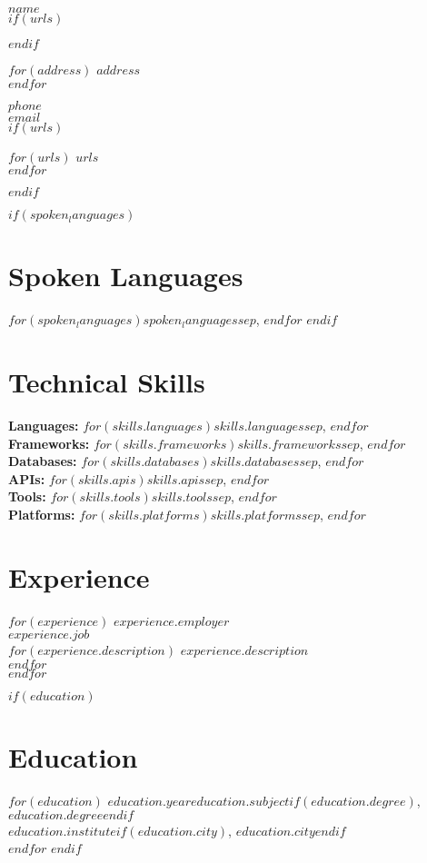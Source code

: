 \documentclass[$fontsize$, a4paper]{article}
\newcommand{\note}[1]{\marginnote{\scriptsize #1}}
\begin{document}
{\LARGE $name$}\\[.2cm]

$if(urls)$
\begin{multicols}{2}
$endif$

$for(address)$
$address$\\
$endfor$

\vspace{-10pt}

$phone$\\
\href{mailto:$email$}{$email$}\\


$if(urls)$
\columnbreak

$for(urls)$
\href{http://$urls$}{$urls$}\\
$endfor$
\end{multicols}
$endif$

\vspace{30pt}

$if(spoken_languages)$
\section*{Spoken Languages}
\noindent
$for(spoken_languages)$$spoken_languages$$sep$, $endfor$
\vspace{20pt}
$endif$

\section*{Technical Skills}
\noindent
\textbf{Languages:} $for(skills.languages)$$skills.languages$$sep$, $endfor$\\[6pt]
\textbf{Frameworks:} $for(skills.frameworks)$$skills.frameworks$$sep$, $endfor$\\[6pt]
\textbf{Databases:} $for(skills.databases)$$skills.databases$$sep$, $endfor$\\[6pt]
\textbf{APIs:} $for(skills.apis)$$skills.apis$$sep$, $endfor$\\[6pt]
\textbf{Tools:} $for(skills.tools)$$skills.tools$$sep$, $endfor$\\[6pt]
\textbf{Platforms:} $for(skills.platforms)$$skills.platforms$$sep$, $endfor$


\vspace{25pt}

\section*{Experience}
\noindent
$for(experience)$
\note{$experience.years$}\textsc{$experience.employer$}\\
  \emph{$experience.job$}\\
  $for(experience.description)$
    $experience.description$\\
  $endfor$\\[.2cm]
$endfor$

$if(education)$
\section*{Education}
\noindent
$for(education)$
  \textbf{$education.year$}\quad \textbf{$education.subject$}$if(education.degree)$, $education.degree$$endif$\\
  \emph{$education.institute$}$if(education.city)$, $education.city$$endif$\\[.2cm]
$endfor$
$endif$
\end{document}
